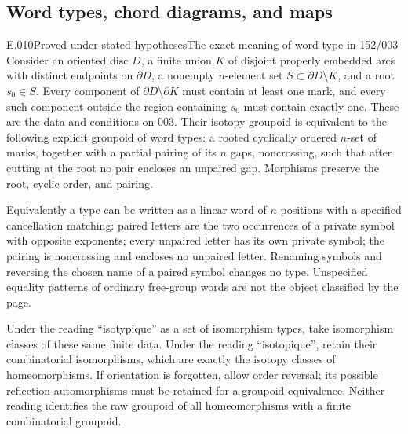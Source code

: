 \subsection{Word types, chord diagrams, and maps}
\begin{saresult}{E.010}{Proved under stated hypotheses}{The exact meaning of word type in 152/003}
Consider an oriented disc $D$, a finite union $K$ of disjoint properly
embedded arcs with distinct endpoints on $\partial D$, a nonempty
$n$-element set $S\subset\partial D\setminus K$, and a root $s_0\in S$.
Every component of $\partial D\setminus\partial K$ must contain at least
one mark, and every such component outside the region containing $s_0$
must contain exactly one. These are the data and conditions on 003.
Their isotopy groupoid is equivalent to the following explicit groupoid
of word types: a rooted cyclically ordered $n$-set of marks, together
with a partial pairing of its $n$ gaps, noncrossing, such that after
cutting at the root no pair encloses an unpaired gap. Morphisms preserve
the root, cyclic order, and pairing.

Equivalently a type can be written as a linear word of $n$ positions
with a specified cancellation matching: paired letters are the two
occurrences of a private symbol with opposite exponents; every unpaired
letter has its own private symbol; the pairing is noncrossing and encloses
no unpaired letter. Renaming symbols and reversing the chosen name of
a paired symbol changes no type. Unspecified equality patterns of ordinary
free-group words are not the object classified by the page.

Under the reading ``isotypique'' as a set of isomorphism types, take
isomorphism classes of these same finite data. Under the reading
``isotopique'', retain their combinatorial isomorphisms, which are exactly
the isotopy classes of homeomorphisms. If orientation is forgotten,
allow order reversal; its possible reflection automorphisms must be
retained for a groupoid equivalence. Neither reading identifies the raw
groupoid of all homeomorphisms with a finite combinatorial groupoid.
\end{saresult}

